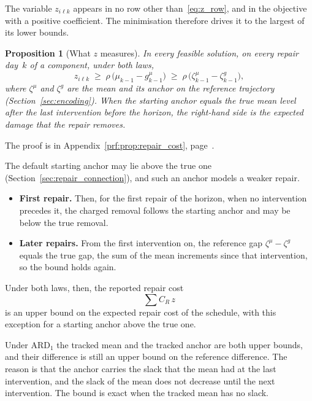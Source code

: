 \documentclass[11pt,a4paper]{article}
\theoremstyle{plain}
\newtheorem{proposition}[theorem]{Proposition}
\theoremstyle{definition}
\theoremstyle{remark}
\begin{document}
The variable $z_{i\ell k}$ appears in no row other than~\eqref{eq:z_row}, and in the objective with a positive coefficient.
The minimisation therefore drives it to the largest of its lower bounds.


\begin{proposition}[What $z$ measures]\label{prop:repair_cost}
In every feasible solution, on every repair day~$k$ of a component, under both laws,
\begin{equation}
  z_{i\ell k} \;\ge\; \rho\,\bigl(\mu_{k-1} - g^{\mu}_{k-1}\bigr) \;\ge\; \rho\,\bigl(\zeta^{\mu}_{k-1} - \zeta^{g}_{k-1}\bigr),
\end{equation}
where $\zeta^{\mu}$ and $\zeta^{g}$ are the mean and its anchor on the reference trajectory (Section~\ref{sec:encoding}).
When the starting anchor equals the true mean level after the last intervention before the horizon, the right-hand side is the expected damage that the repair removes.
\end{proposition}
The proof is in Appendix~\ref{prf:prop:repair_cost}, page~\pageref{prf:prop:repair_cost}.

The default starting anchor may lie above the true one (Section~\ref{sec:repair_connection}), and such an anchor models a weaker repair.
\begin{itemize}
  \item \textbf{First repair.} Then, for the first repair of the horizon, when no intervention precedes it, the charged removal follows the starting anchor and may be below the true removal.
  \item \textbf{Later repairs.} From the first intervention on, the reference gap $\zeta^{\mu} - \zeta^{g}$ equals the true gap, the sum of the mean increments since that intervention, so the bound holds again.
\end{itemize}
Under both laws, then, the reported repair cost
\begin{equation}
  \sum C_R\, z
\end{equation}
is an upper bound on the expected repair cost of the schedule, with this exception for a starting anchor above the true one.

Under $\text{ARD}_1$ the tracked mean and the tracked anchor are both upper bounds, and their difference is still an upper bound on the reference difference.
The reason is that the anchor carries the slack that the mean had at the last intervention, and the slack of the mean does not decrease until the next intervention.
The bound is exact when the tracked mean has no slack.
\end{document}
